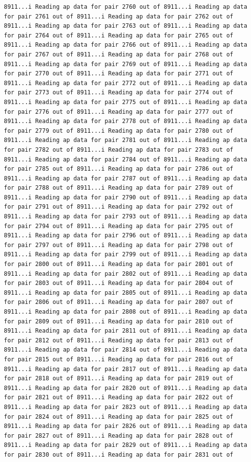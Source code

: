 \documentclass[
]{article}
\begin{document}
\begin{verbatim}
8911...i Reading ap data for pair 2760 out of 8911...i Reading ap data for pair 2761 out of 8911...i Reading ap data for pair 2762 out of 8911...i Reading ap data for pair 2763 out of 8911...i Reading ap data for pair 2764 out of 8911...i Reading ap data for pair 2765 out of 8911...i Reading ap data for pair 2766 out of 8911...i Reading ap data for pair 2767 out of 8911...i Reading ap data for pair 2768 out of 8911...i Reading ap data for pair 2769 out of 8911...i Reading ap data for pair 2770 out of 8911...i Reading ap data for pair 2771 out of 8911...i Reading ap data for pair 2772 out of 8911...i Reading ap data for pair 2773 out of 8911...i Reading ap data for pair 2774 out of 8911...i Reading ap data for pair 2775 out of 8911...i Reading ap data for pair 2776 out of 8911...i Reading ap data for pair 2777 out of 8911...i Reading ap data for pair 2778 out of 8911...i Reading ap data for pair 2779 out of 8911...i Reading ap data for pair 2780 out of 8911...i Reading ap data for pair 2781 out of 8911...i Reading ap data for pair 2782 out of 8911...i Reading ap data for pair 2783 out of 8911...i Reading ap data for pair 2784 out of 8911...i Reading ap data for pair 2785 out of 8911...i Reading ap data for pair 2786 out of 8911...i Reading ap data for pair 2787 out of 8911...i Reading ap data for pair 2788 out of 8911...i Reading ap data for pair 2789 out of 8911...i Reading ap data for pair 2790 out of 8911...i Reading ap data for pair 2791 out of 8911...i Reading ap data for pair 2792 out of 8911...i Reading ap data for pair 2793 out of 8911...i Reading ap data for pair 2794 out of 8911...i Reading ap data for pair 2795 out of 8911...i Reading ap data for pair 2796 out of 8911...i Reading ap data for pair 2797 out of 8911...i Reading ap data for pair 2798 out of 8911...i Reading ap data for pair 2799 out of 8911...i Reading ap data for pair 2800 out of 8911...i Reading ap data for pair 2801 out of 8911...i Reading ap data for pair 2802 out of 8911...i Reading ap data for pair 2803 out of 8911...i Reading ap data for pair 2804 out of 8911...i Reading ap data for pair 2805 out of 8911...i Reading ap data for pair 2806 out of 8911...i Reading ap data for pair 2807 out of 8911...i Reading ap data for pair 2808 out of 8911...i Reading ap data for pair 2809 out of 8911...i Reading ap data for pair 2810 out of 8911...i Reading ap data for pair 2811 out of 8911...i Reading ap data for pair 2812 out of 8911...i Reading ap data for pair 2813 out of 8911...i Reading ap data for pair 2814 out of 8911...i Reading ap data for pair 2815 out of 8911...i Reading ap data for pair 2816 out of 8911...i Reading ap data for pair 2817 out of 8911...i Reading ap data for pair 2818 out of 8911...i Reading ap data for pair 2819 out of 8911...i Reading ap data for pair 2820 out of 8911...i Reading ap data for pair 2821 out of 8911...i Reading ap data for pair 2822 out of 8911...i Reading ap data for pair 2823 out of 8911...i Reading ap data for pair 2824 out of 8911...i Reading ap data for pair 2825 out of 8911...i Reading ap data for pair 2826 out of 8911...i Reading ap data for pair 2827 out of 8911...i Reading ap data for pair 2828 out of 8911...i Reading ap data for pair 2829 out of 8911...i Reading ap data for pair 2830 out of 8911...i Reading ap data for pair 2831 out of 
\end{verbatim}
\end{document}
